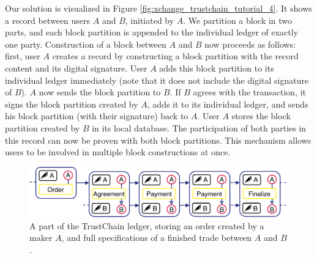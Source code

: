 Our solution is visualized in Figure \ref{fig:xchange_trustchain_tutorial_4}.
It shows a record between users $ A $ and $ B $, initiated by $ A $.
We partition a block in two parts, and each block partition is appended to the individual ledger of exactly one party.
Construction of a block between $ A $ and $ B $ now proceeds as follows: first, user $ A $ creates a record by constructing a block partition with the record content and its digital signature.
User $ A $ adds this block partition to its individual ledger immediately (note that it does not include the digital signature of $ B $).
$ A $ now sends the block partition to $ B $.
If $ B $ agrees with the transaction, it signs the block partition created by $ A $, adds it to its individual ledger, and sends his block partition (with their signature) back to $ A $.
User $ A $ stores the block partition created by $ B $ in its local database.
The participation of both parties in this record can now be proven with both block partitions.
This mechanism allows users to be involved in multiple block constructions at once.

\begin{figure}[t]
	\centering
	\includegraphics[width=\linewidth]{xchange/assets/trustchain_market}
	\caption{A part of the TrustChain ledger, storing an order created by a maker $ A $, and full specifications of a finished trade between $ A $ and $ B $.}
	\label{fig:trustchain_market}
\end{figure}

